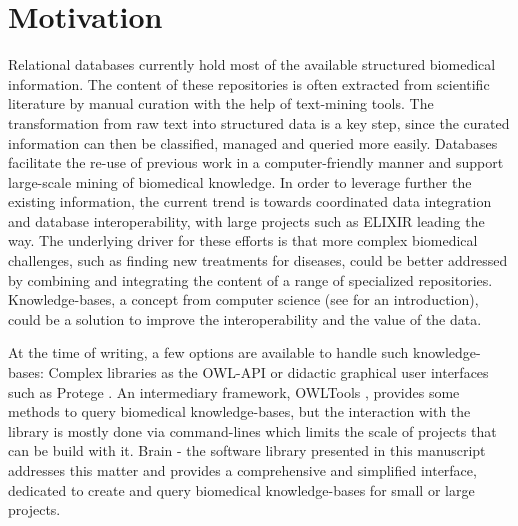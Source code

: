 \documentclass{bioinfo}
\begin{document}
\section{Motivation}
Relational databases currently hold most of the available structured biomedical information. The content of these repositories is often
extracted from scientific literature by manual curation with the help of text-mining tools. The transformation from raw text into
structured data is a key step, since the curated information can then be classified, managed and queried more easily. Databases facilitate
the re-use of previous work in a computer-friendly manner and support large-scale mining of
biomedical knowledge. In order to leverage further
the existing information, the current trend is towards coordinated data integration and database interoperability,
with large projects such as ELIXIR \citep{Crosswell2012} leading the way.
The underlying driver for these efforts is that more complex biomedical challenges, such as finding new treatments for diseases, could be better
addressed by combining and integrating the content of a range of specialized repositories.
Knowledge-bases, a concept from computer science (see \citealp{Krotzsch2012} for an introduction),
could be a solution to improve the interoperability and the value of the data.

At the time of writing, a few options are available to handle such knowledge-bases: Complex
libraries as the OWL-API \citep{MatthewHorridge2011} or didactic graphical user interfaces such as
Protege \citep{StanfordCenterforBiomedicalInformaticsResearch}. An intermediary framework,
OWLTools \citep{MungallC},
provides some methods to query biomedical knowledge-bases, but the interaction with the library is mostly done via command-lines which
limits the scale of projects that can be build with it.
Brain - the software library presented in this manuscript addresses this matter and provides a comprehensive and simplified
interface, dedicated to create and query biomedical knowledge-bases for small or large projects.
\end{document}
